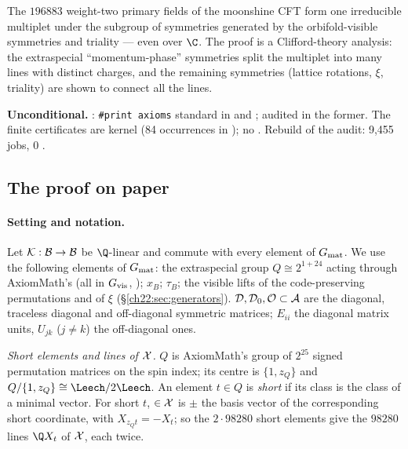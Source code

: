\begin{physics}
The $196883$ weight-two primary fields of the moonshine CFT form one irreducible multiplet under the subgroup of symmetries
generated by the orbifold-visible symmetries and triality --- even over $\C$.  The proof is a Clifford-theory analysis: the
extraspecial ``momentum-phase'' symmetries split the multiplet into many lines with distinct charges, and the remaining
symmetries (lattice rotations, $\xi$, triality) are shown to connect all the lines.
\end{physics}

\begin{status}
\textbf{Unconditional.}  : \texttt{\#print axioms} standard in
 and ;
 audited in the former.  The finite certificates are kernel  (84 occurrences in
); no .  Rebuild of the audit: 9,455 jobs,
0 .
\end{status}

\subsection{The proof on paper}

\paragraph{Setting and notation.}  Let $\mathcal K:\mathcal{B}\to\mathcal{B}$ be $\Q$-linear and commute with every element
of $G_{\mathrm{mat}}$.  We use the following elements of $G_{\mathrm{mat}}$: the extraspecial group $Q\cong2^{1+24}$ acting through
AxiomMath's  (all in $G_{\mathrm{vis}}$, ); $x_B$; $\tau_B$; the visible lifts of the
code-preserving permutations and of $\xi$ (\S\ref{ch22:sec:generators}).  $\mathcal D,\mathcal D_0,\mathcal O\subset\mathcal{A}$ are
the diagonal, traceless diagonal and off-diagonal symmetric matrices; $E_{ii}$ the diagonal matrix units, $U_{jk}$ ($j\ne k$)
the off-diagonal ones.

\emph{Short elements and lines of $\mathcal{X}$.}  $Q$ is AxiomMath's group of $2^{25}$ signed permutation matrices on the
spin index; its centre is $\{1,z_Q\}$ and $Q/\{1,z_Q\}\cong\Leech/2\Leech$.  An element $t\in Q$ is \emph{short} if its class
is the class of a minimal vector.  For short $t$,  $\in\mathcal{X}$ is $\pm$ the basis vector of the
corresponding short coordinate, with $X_{z_Qt}=-X_t$; so the $2\cdot98280$ short elements give the $98280$ lines $\Q X_t$ of
$\mathcal{X}$, each twice.

